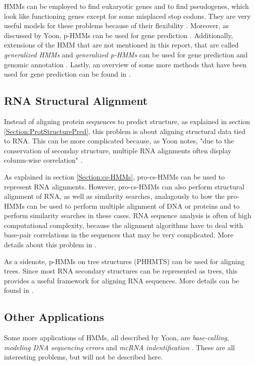 \documentclass{article}\usepackage[]{graphicx}\usepackage[]{color}
\begin{document}
HMMs can be employed to find eukaryotic genes and to find pseudogenes, which look like functioning genes except for some misplaced stop codons. They are very useful models for these problems because of their flexibility \cite{Christianini2006}. Moreover, as discussed by Yoon, p-HMMs can be used for gene prediction \cite{Yoon2009}. Additionally, extensions of the HMM that are not mentioned in this report, that are called \textit{generalized HMMs} and \textit{generalized p-HMMs} can be used for gene prediction and genomic annotation \cite{Choo2004} \cite{Yoon2009}. Lastly, an overview of some more methods that have been used for gene prediction can be found in \cite{Sleator2010}.

\subsection{RNA Structural Alignment}\label{RNAStructuralAlignment}
Instead of aligning protein sequences to predict structure, as explained in section \ref{Section:ProtStructurePred}, this problem is about aligning structural data tied to RNA. This can be more complicated because, as Yoon notes, "due to the conservation of seconday structure, multiple RNA alignments often display column-wise correlation" \cite{Yoon2009}.

As explained in section \ref{Section:cs-HMMs}, pro-cs-HMMs can be used to represent RNA alignments. However, pro-cs-HMMs can also perform structural alignment of RNA, as well as similarity searches, analagously to how the pro-HMMs can be used to perform multiple alignment of DNA or proteins and to perform similarity searches in these cases. RNA sequence analysis is often of high computational complexity, because the alignment algorithms have to deal with base-pair correlations in the sequences that may be very complicated. More details about this problem in \cite{Yoon2009}.

As a sidenote, p-HMMs on tree structures (PHHMTS) can be used for aligning trees. Since most RNA secondary structures can be represented as trees, this provides a useful framework for aligning RNA sequences. More details can be found in \cite{Sakakibara2003}.

\subsection{Other Applications}
Some more applications of HMMs, all described by Yoon, are \textit{base-calling}, \textit{modeling DNA sequencing errors} and \textit{mcRNA indentification} \cite{Yoon2009}. These are all interesting problems, but will not be described here. 
\end{document}
